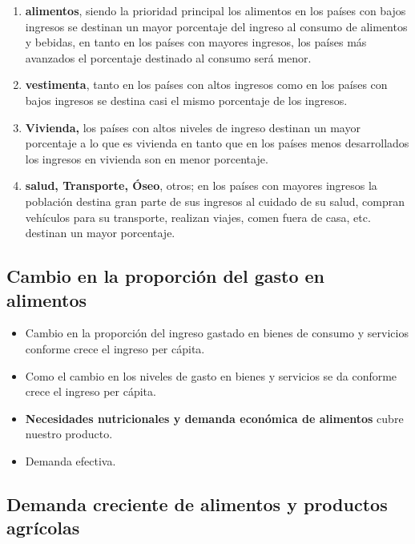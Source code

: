\documentclass[
  letterpaper,
  DIV=11,
  numbers=noendperiod]{scrartcl}
\begin{document}
\begin{enumerate}
\def\labelenumi{\arabic{enumi}.}
\item
  \textbf{alimentos}, siendo la prioridad principal los alimentos en los
  países con bajos ingresos se destinan un mayor porcentaje del ingreso
  al consumo de alimentos y bebidas, en tanto en los países con mayores
  ingresos, los países más avanzados el porcentaje destinado al consumo
  será menor.
\item
  \textbf{vestimenta}, tanto en los países con altos ingresos como en
  los países con bajos ingresos se destina casi el mismo porcentaje de
  los ingresos.
\item
  \textbf{Vivienda,} los países con altos niveles de ingreso destinan un
  mayor porcentaje a lo que es vivienda en tanto que en los países menos
  desarrollados los ingresos en vivienda son en menor porcentaje.
\item
  \textbf{salud, Transporte, Óseo}, otros; en los países con mayores
  ingresos la población destina gran parte de sus ingresos al cuidado de
  su salud, compran vehículos para su transporte, realizan viajes, comen
  fuera de casa, etc. destinan un mayor porcentaje.
\end{enumerate}

\hypertarget{cambio-en-la-proporciuxf3n-del-gasto-en-alimentos}{%
\subsection{Cambio en la proporción del gasto en
alimentos}\label{cambio-en-la-proporciuxf3n-del-gasto-en-alimentos}}

\begin{itemize}
\item
  Cambio en la proporción del ingreso gastado en bienes de consumo y
  servicios conforme crece el ingreso per cápita.
\item
  Como el cambio en los niveles de gasto en bienes y servicios se da
  conforme crece el ingreso per cápita.
\item
  \textbf{Necesidades nutricionales y demanda económica de alimentos}
  cubre nuestro producto.
\item
  Demanda efectiva.
\end{itemize}

\hypertarget{demanda-creciente-de-alimentos-y-productos-agruxedcolas}{%
\subsection{Demanda creciente de alimentos y productos
agrícolas}\label{demanda-creciente-de-alimentos-y-productos-agruxedcolas}}
\end{document}
